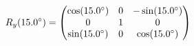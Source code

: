 \documentclass[preview]{standalone}
\begin{document}
\begin{align*}
\special{dvisvgm:raw <g id='unique000'>}R_y(15.0^\circ) = \begin{pmatrix} \cos(15.0^\circ) & 0 & -\sin(15.0^\circ) \\ 0 & 1 & 0 \\ \sin(15.0^\circ) & 0 & \cos(15.0^\circ) \end{pmatrix}\special{dvisvgm:raw </g>}
\end{align*}
\end{document}

